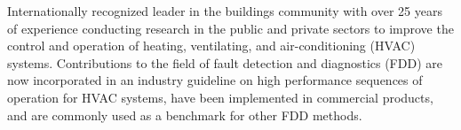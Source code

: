 

\begin{cvparagraph}

Internationally recognized leader in the buildings community with over 25 years of experience conducting research in the public and private sectors to improve the control and operation of heating, ventilating, and air-conditioning (HVAC) systems. Contributions to the field of fault detection and diagnostics (FDD) are now incorporated in an industry guideline on high performance sequences of operation for HVAC systems, have been implemented in commercial products, and are commonly used as a benchmark for other FDD methods.

\end{cvparagraph}

